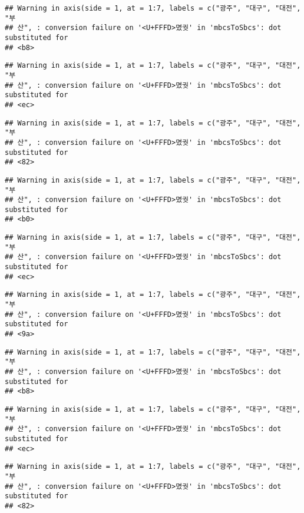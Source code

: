 \documentclass[]{article}
\begin{document}
\begin{verbatim}
## Warning in axis(side = 1, at = 1:7, labels = c("광주", "대구", "대전", "부
## 산", : conversion failure on '<U+FFFD>몄궛' in 'mbcsToSbcs': dot substituted for
## <b8>
\end{verbatim}

\begin{verbatim}
## Warning in axis(side = 1, at = 1:7, labels = c("광주", "대구", "대전", "부
## 산", : conversion failure on '<U+FFFD>몄궛' in 'mbcsToSbcs': dot substituted for
## <ec>
\end{verbatim}

\begin{verbatim}
## Warning in axis(side = 1, at = 1:7, labels = c("광주", "대구", "대전", "부
## 산", : conversion failure on '<U+FFFD>몄궛' in 'mbcsToSbcs': dot substituted for
## <82>
\end{verbatim}

\begin{verbatim}
## Warning in axis(side = 1, at = 1:7, labels = c("광주", "대구", "대전", "부
## 산", : conversion failure on '<U+FFFD>몄궛' in 'mbcsToSbcs': dot substituted for
## <b0>
\end{verbatim}

\begin{verbatim}
## Warning in axis(side = 1, at = 1:7, labels = c("광주", "대구", "대전", "부
## 산", : conversion failure on '<U+FFFD>몄궛' in 'mbcsToSbcs': dot substituted for
## <ec>
\end{verbatim}

\begin{verbatim}
## Warning in axis(side = 1, at = 1:7, labels = c("광주", "대구", "대전", "부
## 산", : conversion failure on '<U+FFFD>몄궛' in 'mbcsToSbcs': dot substituted for
## <9a>
\end{verbatim}

\begin{verbatim}
## Warning in axis(side = 1, at = 1:7, labels = c("광주", "대구", "대전", "부
## 산", : conversion failure on '<U+FFFD>몄궛' in 'mbcsToSbcs': dot substituted for
## <b8>
\end{verbatim}

\begin{verbatim}
## Warning in axis(side = 1, at = 1:7, labels = c("광주", "대구", "대전", "부
## 산", : conversion failure on '<U+FFFD>몄궛' in 'mbcsToSbcs': dot substituted for
## <ec>
\end{verbatim}

\begin{verbatim}
## Warning in axis(side = 1, at = 1:7, labels = c("광주", "대구", "대전", "부
## 산", : conversion failure on '<U+FFFD>몄궛' in 'mbcsToSbcs': dot substituted for
## <82>
\end{verbatim}
\end{document}
